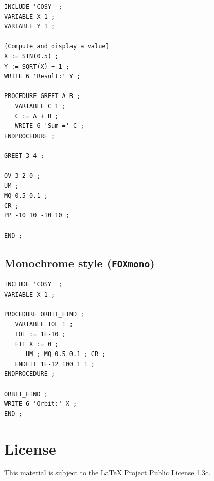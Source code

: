 \documentclass{article}
\begin{document}
\begin{lstlisting}[style=FOXcolor]
INCLUDE 'COSY' ;
VARIABLE X 1 ;
VARIABLE Y 1 ;

{Compute and display a value}
X := SIN(0.5) ;
Y := SQRT(X) + 1 ;
WRITE 6 'Result:' Y ;

PROCEDURE GREET A B ;
   VARIABLE C 1 ;
   C := A + B ;
   WRITE 6 'Sum =' C ;
ENDPROCEDURE ;

GREET 3 4 ;

OV 3 2 0 ;
UM ;
MQ 0.5 0.1 ;
CR ;
PP -10 10 -10 10 ;

END ;
\end{lstlisting}

\subsection{Monochrome style (\texttt{FOXmono})}

\begin{lstlisting}[style=FOXmono]
INCLUDE 'COSY' ;
VARIABLE X 1 ;

PROCEDURE ORBIT_FIND ;
   VARIABLE TOL 1 ;
   TOL := 1E-10 ;
   FIT X := 0 ;
      UM ; MQ 0.5 0.1 ; CR ;
   ENDFIT 1E-12 100 1 1 ;
ENDPROCEDURE ;

ORBIT_FIND ;
WRITE 6 'Orbit:' X ;
END ;
\end{lstlisting}

\section{License}

This material is subject to the \LaTeX{} Project Public License 1.3c.
\end{document}
